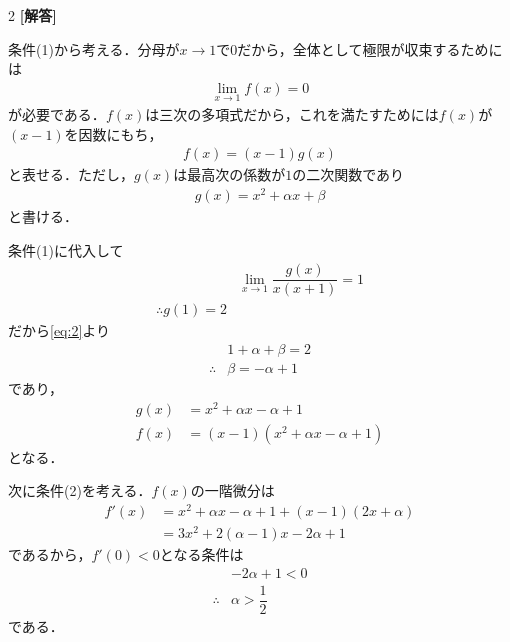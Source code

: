 \documentclass[../../main.tex]{subfiles}
\begin{document}
\setcounter{equation}{0}
\begin{oframed}
  
\end{oframed}
\setlength{\columnseprule}{0.4pt}
\begin{multicols}{2}
  {\bf [解答]}

  条件(1)から考える．分母が$x \to 1$で$0$だから，全体として極限が収束するためには
  \begin{align}
    \lim_{x\to 1} f(x) = 0
  \end{align}
  が必要である．$f(x)$は三次の多項式だから，これを満たすためには$f(x)$が$(x-1)$を因数にもち，
  \begin{align}
    f(x) = (x-1)g(x) \label{eq:1}
  \end{align}
  と表せる．ただし，$g(x)$は最高次の係数が$1$の二次関数であり
  \begin{align}
    g(x) = x^2+\alpha x + \beta \label{eq:2}
  \end{align}
  と書ける．

  条件(1)に代入して
  \begin{align}
    & \lim_{x \to 1} \dfrac{g(x)}{x(x+1)}=1 \\
    \therefore
    g(1) = 2
  \end{align}
  だから\cref{eq:2}より
  \begin{align}
    & 1+\alpha+\beta =2   \\
    \therefore
    & \beta = -\alpha + 1
  \end{align}
  であり，
  \begin{align}
    g(x) & = x^2 + \alpha x -\alpha +1                            \\
    f(x) & = (x-1)(x^2 + \alpha x -\alpha +1) \label{eq:3}
  \end{align}
  となる．

  次に条件(2)を考える．$f(x)$の一階微分は
  \begin{align}
    f'(x)
    & =x^2+\alpha x-\alpha+1+(x-1)(2x+\alpha) \\
    & =3x^2+2(\alpha-1)x-2\alpha+1
  \end{align}
  であるから，$f'(0)<0$となる条件は
  \begin{align}
    & -2\alpha + 1 < 0                      \\
    \therefore
    & \alpha>\dfrac{1}{2}\label{eq:4}
  \end{align}
  である．


\end{multicols}
\end{document}
